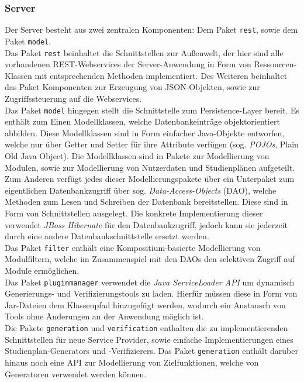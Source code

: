 \subsubsection{Server}
Der Server besteht aus zwei zentralen Komponenten: Dem Paket \texttt{rest}, sowie dem Paket \texttt{model}. \\
Das Paket \texttt{rest} beinhaltet die Schnittstellen zur Außenwelt, der hier sind alle vorhandenen REST-Webservices der Server-Anwendung in Form von Ressourcen-Klassen mit entsprechenden Methoden implementiert. Des Weiteren beinhaltet das Paket Komponenten zur Erzeugung von JSON-Objekten, sowie zur Zugriffssteuerung auf die Webservices. \\
Das Paket \texttt{model} hingegen stellt die Schnittstelle zum Persistence-Layer bereit. Es enthält zum Einen Modellklassen, welche Datenbankeinträge objektorientiert abbilden. Diese Modellklassen sind in Form einfacher Java-Objekte entworfen, welche nur über Getter und Setter für ihre Attribute verfügen (sog. \emph{POJOs}, Plain Old Java Object). Die Modellklassen sind in Pakete zur Modellierung von Modulen, sowie zur Modellierung von Nutzerdaten und Studienplänen aufgeteilt. Zum Anderen verfügt jedes dieser Modellierungspakete über ein Unterpaket zum eigentlichen Datenbankzugriff über sog. \emph{Data-Access-Objects} (DAO), welche Methoden zum Lesen und Schreiben der Datenbank bereitstellen. Diese sind in Form von Schnittstellen ausgelegt. Die konkrete Implementierung dieser verwendet \emph{JBoss Hibernate} für den Datenbankzugriff, jedoch kann sie jederzeit durch eine andere Datenbankschnittstelle ersetzt werden.\\
Das Paket \texttt{filter} enthält eine Kompositium-basierte Modellierung von Modulfiltern, welche im Zusammenspiel mit den DAOs den selektiven Zugriff auf Module ermöglichen. \\
Das Paket \texttt{pluginmanager} verwendet die \emph{Java ServiceLoader API} um dynamisch Generierungs- und Verifizierungstools zu laden. Hierfür müssen diese in Form von Jar-Dateien dem Klassenpfad hinzugefügt werden, wodurch ein Austausch von Tools ohne Änderungen an der Anwendung möglich ist. \\
Die Pakete \texttt{generation} und \texttt{verification} enthalten die zu implementierenden Schnittstellen für neue Service Provider, sowie einfache Implementierungen eines Studienplan-Generators und -Verifizierers. Das Paket \texttt{generation} enthält darüber hinaus noch eine API zur Modellierung von Zielfunktionen, welche von Generatoren verwendet werden können.
